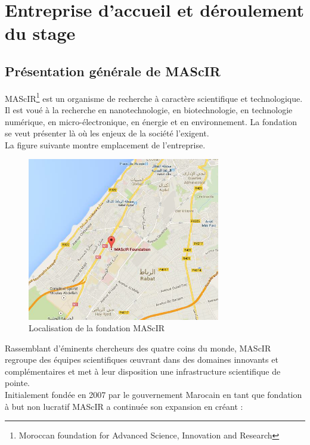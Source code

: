 \documentclass[11pt, a4paper, twoside]{book}
\begin{document}
\pagestyle{plain}

\chapter{Entreprise d'accueil et déroulement du stage}
\pagestyle{headings}
\section{Présentation générale de MAScIR}
MAScIR\footnote{Moroccan foundation for Advanced Science, Innovation and Research} est un organisme de recherche à caractère scientifique et technologique. Il est voué à la recherche en nanotechnologie, en biotechnologie, en technologie numérique, en micro-électronique, en énergie et en environnement. La fondation se veut présenter là où les enjeux de la société l’exigent.\\

La figure suivante montre emplacement de l’entreprise.

\begin{figure}[h]
\centering
\includegraphics[width=0.75\textwidth]{mascir_map}
\caption{Localisation de la fondation MAScIR}
\end{figure}

Rassemblant d’éminents chercheurs des quatre coins du monde, MAScIR regroupe des équipes scientifiques œuvrant dans des domaines innovants et complémentaires et met à leur disposition une infrastructure scientifique de pointe.\\

Initialement fondée en 2007 par le gouvernement Marocain en tant que fondation à but non lucratif MAScIR a continuée son expansion en créant :
\end{document}
